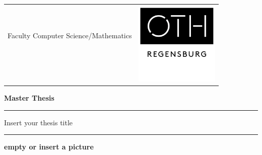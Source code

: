 

\titlepage

\begin{center}

\begin{tabular}{cc}
& \multirow{5}{*}{
\includegraphics[height=4.0cm]{images/cover_sheet/OTH_Regensburg_neues_Logo_01}}\tabularnewline

{\large{}Faculty Computer Science/Mathematics}\hspace{1.5cm} & \tabularnewline
 & \tabularnewline
 & \tabularnewline
 & \tabularnewline
\end{tabular}
\par\end{center}

\noindent 
\vspace{0.7cm}


\noindent \begin{center}
\textbf{\huge{}Master Thesis}
\par\end{center}{\Large \par}


\noindent
\rule{\textwidth}{0.3pt}
\vspace{0.01cm}

\begin{doublespace}
\noindent \begin{center}
{\Large{Insert your thesis title}}
\par\end{center}{\large \par}
\end{doublespace}
\noindent\rule{\textwidth}{0.3pt}


\vspace{0.9cm}
\begin{center}
\textbf{\huge{} empty or insert a picture}
\end{center}

\vspace{1.0cm}


